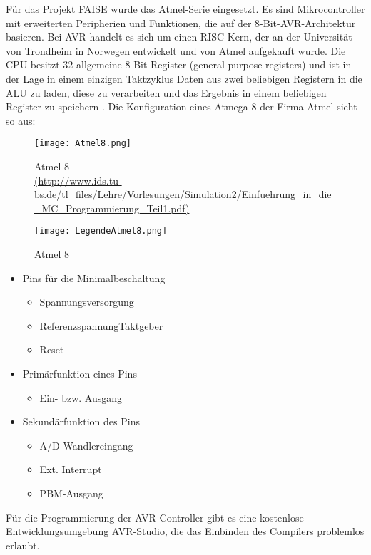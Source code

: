 F\"ur das Projekt FAISE wurde das Atmel-Serie eingesetzt. Es sind Mikrocontroller mit erweiterten Peripherien und Funktionen, die auf der 8-Bit-AVR-Architektur basieren. Bei AVR handelt es sich um einen RISC-Kern, der an der Universit\"at von Trondheim in Norwegen entwickelt und von Atmel aufgekauft wurde. Die CPU besitzt 32 allgemeine 8-Bit Register (general purpose registers) und ist in der Lage in einem einzigen Taktzyklus Daten aus zwei beliebigen Registern in die ALU zu laden, diese zu verarbeiten und das Ergebnis in einem beliebigen Register zu speichern \cite{Viktor:Seib:2014:Online}. Die Konfiguration eines Atmega 8 der Firma Atmel sieht so aus:
\begin{figure}[h!]
	\centering
		\texttt{[image: Atmel8.png]}
	\caption{Atmel 8 \\ \url{(http://www.ids.tu-bs.de/tl\_files/Lehre/Vorlesungen/Simulation2/Einfuehrung\_in\_die\_MC\_Programmierung\_Teil1.pdf)}}
	\label{Atmel 8}
\end{figure}
\begin{figure}[h!]
	\centering
		\texttt{[image: LegendeAtmel8.png]}
	\caption{Atmel 8 }
	\label{Legende Atmel8}
\end{figure}
\begin{itemize}
\item Pins f\"ur die Minimalbeschaltung
\begin{itemize}
          \item Spannungsversorgung
          \item ReferenzspannungTaktgeber
          \item Reset      
					\end{itemize}
\item Prim\"arfunktion eines Pins
\begin{itemize}
          \item Ein- bzw. Ausgang
					\end{itemize}
\item Sekund\"arfunktion des Pins
\begin{itemize}
          \item A/D-Wandlereingang
          \item Ext. Interrupt
          \item PBM-Ausgang   
\end{itemize}
\end{itemize}
F\"ur die Programmierung der AVR-Controller gibt es eine kostenlose Entwicklungsumgebung AVR-Studio, die das Einbinden des Compilers problemlos erlaubt.

